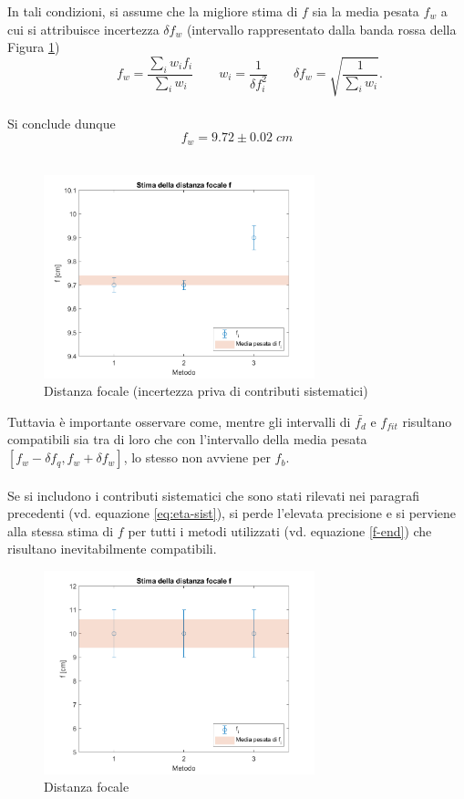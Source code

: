 \documentclass[11pt,a4paper]{article}
\begin{document}
In tali condizioni, si assume che la migliore stima di $f$ sia la media pesata $f_w$ a cui si attribuisce incertezza $\delta f_w$ (intervallo rappresentato dalla banda rossa della Figura \ref{fig:fs})
\\
\begin{equation}
    \qquad{f_w = \frac{\sum_i w_i f_i}{\sum_i w_i}}
    \qquad{w_i = \frac{1}{\delta f_i ^2}}
    \qquad{\delta f_w = \sqrt{\frac{1}{\sum_i w_i}}}.
\end{equation}
\\
Si conclude dunque
\begin{equation}
    f_w = 9.72 \pm 0.02 \; cm
\end{equation}
\\
\begin{figure}[H]
    \centering
    \includegraphics[width=0.7\textwidth]{fs.png}
    \caption{Distanza focale (incertezza priva di contributi sistematici)}
    \label{fig:fs}
\end{figure}
Tuttavia è importante osservare come, mentre gli intervalli di $\bar{f_d}$ e $f_{fit}$ risultano compatibili sia tra di loro che con l'intervallo della media pesata $[f_w-\delta f_q, f_w + \delta f_w]$, lo stesso non avviene per $f_b$.
\\ \\
Se si includono i contributi sistematici che sono stati rilevati nei paragrafi precedenti (vd. equazione \ref{eq:eta-sist}), si perde l'elevata precisione e si perviene alla stessa stima di $f$ per tutti i metodi utilizzati (vd. equazione \ref{f-end}) che risultano inevitabilmente compatibili.
\begin{figure}[H]
    \centering
    \includegraphics[width=0.7\textwidth]{fs-sist.png}
    \caption{Distanza focale}
    \label{fig:fs-sist}
\end{figure}
\end{document}
